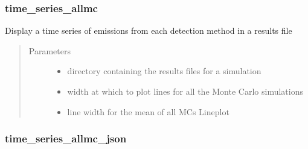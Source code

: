 \documentclass[letterpaper,10pt,english]{sphinxmanual}
\begin{document}
\subsubsection{time\_series\_allmc}
\label{\detokenize{index:time-series-allmc}}

\begin{fulllineitems}
\label{\detokenize{index:feast.ResultsProcessing.plotting_functions.time_series_allmc}}
Display a time series of emissions from each detection method in a results file
\begin{quote}\begin{description}
\item[{Parameters}] \leavevmode\begin{itemize}
\item {} 
 \textendash{} directory containing the results files for a simulation

\item {} 
 \textendash{} width at which to plot lines for all the Monte Carlo simulations

\item {} 
 \textendash{} line width for the mean of all MCs Line\sphinxhyphen{}plot

\end{itemize}

\end{description}\end{quote}

\end{fulllineitems}



\subsubsection{time\_series\_allmc\_json}
\label{\detokenize{index:time-series-allmc-json}}
\end{document}
